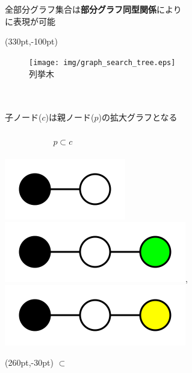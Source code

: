 \begin{tcolorbox}[colbacktitle=gray, title={\fontsize{35pt}{0pt}\selectfont 内部ノードにおける分割ルールの学習}]
	 \\
	\vspace{10pt} \\
	全部分グラフ集合は{\bf \fontsize{26pt}{0pt}\selectfont 部分グラフ同型関係}により\\
	に表現が可能  \\
	\begin{textblock*}{\textwidth}(330pt,-100pt)
		\begin{figure}[h]
			\texttt{[image: img/graph\_search\_tree.eps]} \\
			\vspace{5pt}
			列挙木
		\end{figure}
	\end{textblock*}

	\vspace{100pt} 
	 \\
	\vspace{10pt}\\
	子ノード($c$)は親ノード($p$)の拡大グラフとなる \\ 
	\vspace{10pt}\\
	$~~~~~~~~~~~~~~~~~~~~~~~~~~ p \subset c$ \\
	\vspace{10pt}\\
	\hspace*{150pt} \includegraphics[width=0.5\graphwidth]{img/subgraph/kw.png}
	\hspace*{90pt} \includegraphics[width=0.7\graphwidth]{img/subgraph/kwg.png},
	\hspace*{-20pt} \includegraphics[width=0.7\graphwidth]{img/subgraph/kwy.png} \\
	\begin{textblock*}{\textwidth}(260pt,-30pt)
		$\subset$
	\end{textblock*}


\end{tcolorbox}
